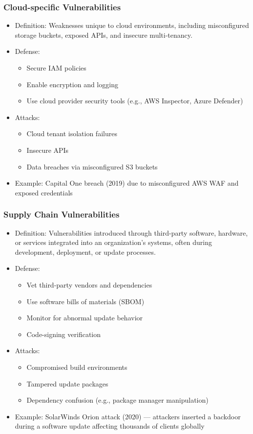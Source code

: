 \documentclass[11pt]{article}
\begin{document}
\subsubsection{Cloud-specific Vulnerabilities}
\label{sec:orgdd44004}
\begin{itemize}
\item Definition: Weaknesses unique to cloud environments, including misconfigured storage buckets, exposed APIs, and insecure multi-tenancy.
\item Defense:
\begin{itemize}
\item Secure IAM policies
\item Enable encryption and logging
\item Use cloud provider security tools (e.g., AWS Inspector, Azure Defender)
\end{itemize}
\item Attacks:
\begin{itemize}
\item Cloud tenant isolation failures
\item Insecure APIs
\item Data breaches via misconfigured S3 buckets
\end{itemize}
\item Example: Capital One breach (2019) due to misconfigured AWS WAF and exposed credentials
\end{itemize}
\subsubsection{Supply Chain Vulnerabilities}
\label{sec:org866a077}
\begin{itemize}
\item Definition: Vulnerabilities introduced through third-party software, hardware, or services integrated into an organization's systems, often during development, deployment, or update processes.
\item Defense:
\begin{itemize}
\item Vet third-party vendors and dependencies
\item Use software bills of materials (SBOM)
\item Monitor for abnormal update behavior
\item Code-signing verification
\end{itemize}
\item Attacks:
\begin{itemize}
\item Compromised build environments
\item Tampered update packages
\item Dependency confusion (e.g., package manager manipulation)
\end{itemize}
\item Example: SolarWinds Orion attack (2020) — attackers inserted a backdoor during a software update affecting thousands of clients globally
\end{itemize}
\end{document}
